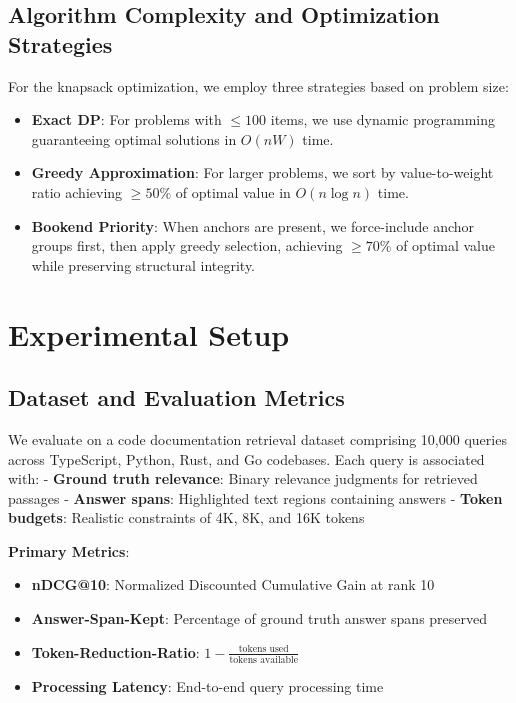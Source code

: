 \documentclass[conference]{IEEEtran}
\begin{document}
\subsection{Algorithm Complexity and Optimization Strategies}

For the knapsack optimization, we employ three strategies based on problem size:

\begin{itemize}
\item \textbf{Exact DP}: For problems with $\leq 100$ items, we use dynamic programming guaranteeing optimal solutions in $O(nW)$ time.
\item \textbf{Greedy Approximation}: For larger problems, we sort by value-to-weight ratio achieving $\geq 50\%$ of optimal value in $O(n \log n)$ time.
\item \textbf{Bookend Priority}: When anchors are present, we force-include anchor groups first, then apply greedy selection, achieving $\geq 70\%$ of optimal value while preserving structural integrity.
\end{itemize}

\section{Experimental Setup}

\subsection{Dataset and Evaluation Metrics}

We evaluate on a code documentation retrieval dataset comprising 10,000 queries across TypeScript, Python, Rust, and Go codebases. Each query is associated with:
- \textbf{Ground truth relevance}: Binary relevance judgments for retrieved passages
- \textbf{Answer spans}: Highlighted text regions containing answers
- \textbf{Token budgets}: Realistic constraints of 4K, 8K, and 16K tokens

\textbf{Primary Metrics}:
\begin{itemize}
\item \textbf{nDCG@10}: Normalized Discounted Cumulative Gain at rank 10
\item \textbf{Answer-Span-Kept}: Percentage of ground truth answer spans preserved
\item \textbf{Token-Reduction-Ratio}: $1 - \frac{\text{tokens used}}{\text{tokens available}}$
\item \textbf{Processing Latency}: End-to-end query processing time
\end{itemize}
\end{document}
